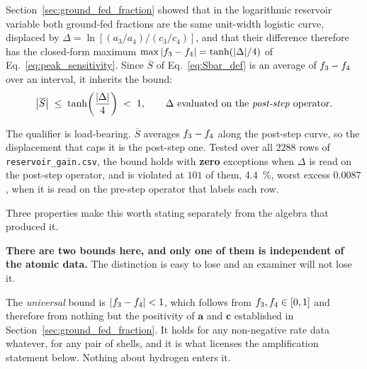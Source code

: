 Section~\ref{sec:ground_fed_fraction} showed that in the logarithmic reservoir
variable both ground-fed fractions are the same unit-width logistic curve,
displaced by $\Delta = \ln[(a_3/a_4)/(c_3/c_4)]$, and that their difference
therefore has the closed-form maximum
$\max|f_{3}-f_{4}| = \tanh(|\Delta|/4)$ of
Eq.~\eqref{eq:peak_sensitivity}. Since $\overline{S}$ of
Eq.~\eqref{eq:Sbar_def} is an average of $f_{3}-f_{4}$ over an
interval, it inherits the bound:
\begin{equation}
  \big|\overline{S}\big| \;\le\; \tanh\!\left(\frac{|\Delta|}{4}\right) \;<\; 1 ,
  \qquad \Delta \text{ evaluated on the \emph{post-step} operator.}
  \label{eq:Sbar_bound}
\end{equation}

\noindent The qualifier is load-bearing.
$\overline{S}$ averages $f_{3}-f_{4}$ along the post-step curve, so the
displacement that caps it is the post-step one. Tested over all $2288$ rows of
\texttt{reservoir\_gain.csv}, the bound holds with \textbf{zero} exceptions when
$\Delta$ is read on the post-step operator, and is violated at $101$ of them,
\SI{4.4}{\percent}, worst excess $0.0087$, when it is read on the pre-step
operator that labels each row.

Three properties make this worth stating separately from the algebra that
produced it.

\textbf{There are two bounds here, and only one of them is independent of the
atomic data.} The distinction is easy to lose and an examiner will not lose it.

The \emph{universal} bound is $|f_{3}-f_{4}| < 1$, which follows from
$f_{3},f_{4} \in [0,1]$ and therefore from nothing but the positivity of
$\bm{a}$ and $\bm{c}$ established in Section~\ref{sec:ground_fed_fraction}. It
holds for any non-negative rate data whatever, for any pair of shells, and it is
what licenses the amplification statement below. Nothing about hydrogen enters
it.

